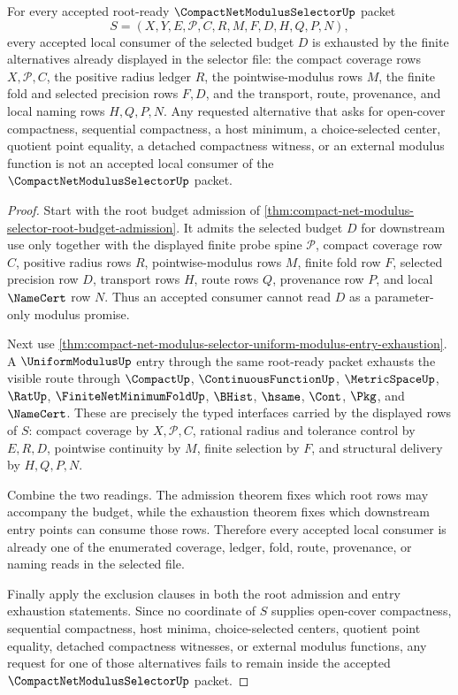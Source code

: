 \begin{theorem}
\label{thm:compact-net-modulus-selector-downstream-coverage}
For every accepted root-ready $\CompactNetModulusSelectorUp$ packet
$$
S=(X,Y,E,\mathcal{P},C,R,M,F,D,H,Q,P,N),
$$
every accepted local consumer of the selected budget $D$ is exhausted by the finite alternatives already displayed in the selector file: the compact coverage rows $X,\mathcal{P},C$, the positive radius ledger $R$, the pointwise-modulus rows $M$, the finite fold and selected precision rows $F,D$, and the transport, route, provenance, and local naming rows $H,Q,P,N$. Any requested alternative that asks for open-cover compactness, sequential compactness, a host minimum, a choice-selected center, quotient point equality, a detached compactness witness, or an external modulus function is not an accepted local consumer of the $\CompactNetModulusSelectorUp$ packet.
\end{theorem}
\begin{proof}
Start with the root budget admission of \autoref{thm:compact-net-modulus-selector-root-budget-admission}. It admits the selected budget $D$ for downstream use only together with the displayed finite probe spine $\mathcal{P}$, compact coverage row $C$, positive radius rows $R$, pointwise-modulus rows $M$, finite fold row $F$, selected precision row $D$, transport rows $H$, route rows $Q$, provenance row $P$, and local $\NameCert$ row $N$. Thus an accepted consumer cannot read $D$ as a parameter-only modulus promise.

Next use \autoref{thm:compact-net-modulus-selector-uniform-modulus-entry-exhaustion}. A $\UniformModulusUp$ entry through the same root-ready packet exhausts the visible route through $\CompactUp$, $\ContinuousFunctionUp$, $\MetricSpaceUp$, $\RatUp$, $\FiniteNetMinimumFoldUp$, $\BHist$, $\hsame$, $\Cont$, $\Pkg$, and $\NameCert$. These are precisely the typed interfaces carried by the displayed rows of $S$: compact coverage by $X,\mathcal{P},C$, rational radius and tolerance control by $E,R,D$, pointwise continuity by $M$, finite selection by $F$, and structural delivery by $H,Q,P,N$.

Combine the two readings. The admission theorem fixes which root rows may accompany the budget, while the exhaustion theorem fixes which downstream entry points can consume those rows. Therefore every accepted local consumer is already one of the enumerated coverage, ledger, fold, route, provenance, or naming reads in the selected file.

Finally apply the exclusion clauses in both the root admission and entry exhaustion statements. Since no coordinate of $S$ supplies open-cover compactness, sequential compactness, host minima, choice-selected centers, quotient point equality, detached compactness witnesses, or external modulus functions, any request for one of those alternatives fails to remain inside the accepted $\CompactNetModulusSelectorUp$ packet.
\end{proof}
